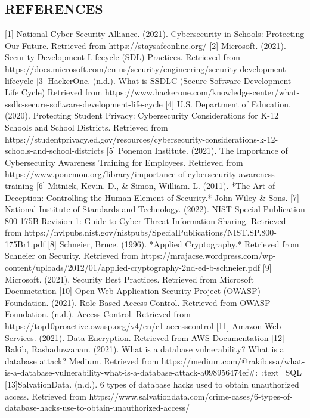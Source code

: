 \documentclass[letterpaper,twocolumn]{article}
\begin{document}
\subsection{REFERENCES}
[1] National Cyber Security Alliance. (2021). Cybersecurity in Schools: Protecting Our Future. Retrieved from https://staysafeonline.org/
[2] Microsoft. (2021). Security Development Lifecycle (SDL) Practices. Retrieved from https://docs.microsoft.com/en-us/security/engineering/security-development-lifecycle
[3] HackerOne. (n.d.). What is SSDLC (Secure Software Development Life Cycle) Retrieved from https://www.hackerone.com/knowledge-center/what-ssdlc-secure-software-development-life-cycle
[4] U.S. Department of Education. (2020). Protecting Student Privacy: Cybersecurity Considerations for K-12 Schools and School Districts. Retrieved from https://studentprivacy.ed.gov/resources/cybersecurity-considerations-k-12-schools-and-school-districts
[5] Ponemon Institute. (2021). The Importance of Cybersecurity Awareness Training for Employees. Retrieved from https://www.ponemon.org/library/importance-of-cybersecurity-awareness-training
[6] Mitnick, Kevin. D., & Simon, William. L. (2011). *The Art of Deception: Controlling the Human Element of Security.* John Wiley & Sons.
[7] National Institute of Standards and Technology. (2022). NIST Special Publication 800-175B Revision 1: Guide to Cyber Threat Information Sharing. Retrieved from https://nvlpubs.nist.gov/nistpubs/SpecialPublications/NIST.SP.800-175Br1.pdf
[8] Schneier, Bruce. (1996). *Applied Cryptography.* Retrieved from Schneier on Security. Retrieved from https://mrajacse.wordpress.com/wp-content/uploads/2012/01/applied-cryptography-2nd-ed-b-schneier.pdf
[9] Microsoft. (2021). Security Best Practices. Retrieved from Microsoft Documetation
[10] Open Web Application Security Project (OWASP) Foundation. (2021). Role Based Access Control. Retrieved from OWASP Foundation. (n.d.). Access Control. Retrieved from https://top10proactive.owasp.org/v4/en/c1-accesscontrol
[11] Amazon Web Services. (2021). Data Encryption. Retrieved from AWS Documentation
[12] Rakib, Rashaduzzanan. (2021). What is a database vulnerability? What is a database attack? Medium. Retrieved from https://medium.com/@rakib.ssa/what-is-a-database-vulnerability-what-is-a-database-attack-a098956474ef#:~:text=SQL%
[13]SalvationData. (n.d.). 6 types of database hacks used to obtain unauthorized access. Retrieved from https://www.salvationdata.com/crime-cases/6-types-of-database-hacks-use-to-obtain-unauthorized-access/
\end{document}
